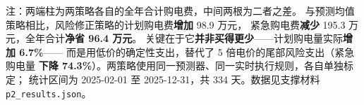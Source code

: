 \noindent 注：两端柱为两策略各自的全年合计购电费，中间两根为二者之差。
与预测均值策略相比，风险修正策略的计划购电费\textbf{增加} 98.9 万元，
紧急购电费\textbf{减少} 195.3 万元，全年合计\textbf{净省 96.4 万元}。
关键在于它\textbf{并非买得更少}——计划购电量实际\textbf{增加 6.7\%}——
而是用低价的确定性支出，替代了 5 倍电价的尾部风险支出（紧急购电量
\textbf{下降 74.3\%}）。两策略使用同一预测器、同一实时执行规则，各自单独标定；
统计区间为 2025-02-01 至 2025-12-31，共 334 天。数据见支撑材料
\texttt{p2\_results.json}。
